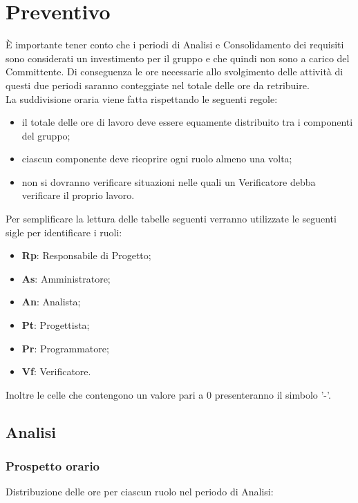 \section{Preventivo}
È importante tener conto che i periodi di Analisi e Consolidamento dei requisiti sono considerati un investimento per il gruppo e che quindi non sono a carico del Committente.
Di conseguenza le ore necessarie allo svolgimento delle attività di questi due periodi saranno conteggiate nel totale delle ore da retribuire. \\

La suddivisione oraria viene fatta rispettando le seguenti regole:
\begin{itemize}
	\item il totale delle ore di lavoro deve essere equamente distribuito tra i componenti del gruppo;
	\item ciascun componente deve ricoprire ogni ruolo almeno una volta;
	\item non si dovranno verificare situazioni nelle quali un Verificatore debba verificare il proprio lavoro.
\end{itemize}

Per semplificare la lettura delle tabelle seguenti verranno utilizzate le seguenti sigle per identificare i ruoli:
\begin{itemize}
	\item \textbf{Rp}: Responsabile di Progetto;
	\item \textbf{As}: Amministratore;
	\item \textbf{An}: Analista;
	\item \textbf{Pt}: Progettista;
	\item \textbf{Pr}: Programmatore;
	\item \textbf{Vf}: Verificatore.
\end{itemize}
Inoltre le celle che contengono un valore pari a 0 presenteranno il simbolo '-'.

\newpage

\subsection{Analisi}
	\subsubsection{Prospetto orario}
		Distribuzione delle ore per ciascun ruolo nel periodo di Analisi:

